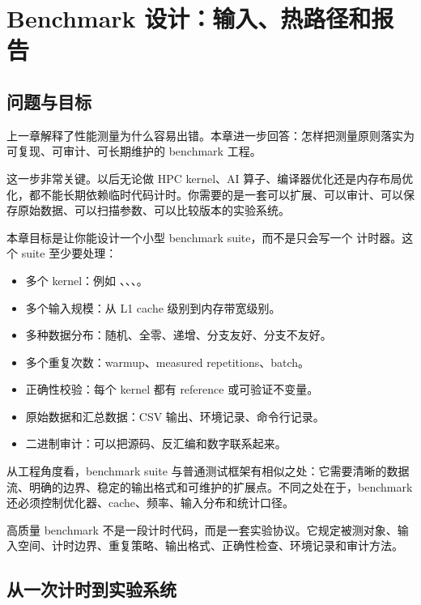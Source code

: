 \chapter{Benchmark 设计：输入、热路径和报告}

\section{问题与目标}

上一章解释了性能测量为什么容易出错。本章进一步回答：怎样把测量原则落实为可复现、可审计、可长期维护的 benchmark 工程。

这一步非常关键。以后无论做 HPC kernel、AI 算子、编译器优化还是内存布局优化，都不能长期依赖临时代码计时。你需要的是一套可以扩展、可以审计、可以保存原始数据、可以扫描参数、可以比较版本的实验系统。

本章目标是让你能设计一个小型 benchmark suite，而不是只会写一个  计时器。这个 suite 至少要处理：

\begin{itemize}
  \item 多个 kernel：例如 、、、。
  \item 多个输入规模：从 L1 cache 级别到内存带宽级别。
  \item 多种数据分布：随机、全零、递增、分支友好、分支不友好。
  \item 多个重复次数：warmup、measured repetitions、batch。
  \item 正确性校验：每个 kernel 都有 reference 或可验证不变量。
  \item 原始数据和汇总数据：CSV 输出、环境记录、命令行记录。
  \item 二进制审计：可以把源码、反汇编和数字联系起来。
\end{itemize}

从工程角度看，benchmark suite 与普通测试框架有相似之处：它需要清晰的数据流、明确的边界、稳定的输出格式和可维护的扩展点。不同之处在于，benchmark 还必须控制优化器、cache、频率、输入分布和统计口径。

\begin{keyidea}
高质量 benchmark 不是一段计时代码，而是一套实验协议。它规定被测对象、输入空间、计时边界、重复策略、输出格式、正确性检查、环境记录和审计方法。
\end{keyidea}

\section{从一次计时到实验系统}

